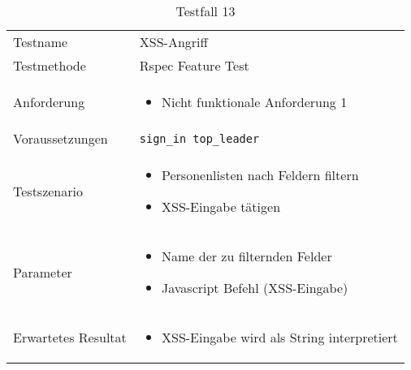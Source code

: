 \begin{table}[h!]
   \begin{tabular}{|L{0.4\textwidth}|L{0.6\textwidth}|}
       \hline
         \\[12pt]
       \hline
        Testname & XSS-Angriff \\
       \hline
       Testmethode & Rspec Feature Test \\
       \hline
        Anforderung & 
        \begin{itemize}
         \item Nicht funktionale Anforderung 1
         \end{itemize}  \\
       \hline
       Voraussetzungen & \texttt{sign\_in top\_leader} \\
       \hline
       Testszenario & 
       \begin{itemize}
         \item Personenlisten nach Feldern filtern
         \item XSS-Eingabe tätigen
       \end{itemize} \\
       \hline
       Parameter & 
       \begin{itemize}
         \item Name der zu filternden Felder
         \item Javascript Befehl (XSS-Eingabe)
       \end{itemize} \\
       \hline
       Erwartetes Resultat & 
       \begin{itemize}
         \item XSS-Eingabe wird als String interpretiert
       \end{itemize} \\
     \hline
     \end{tabular}
     \caption{Testfall 13}
\end{table}

\newpage

